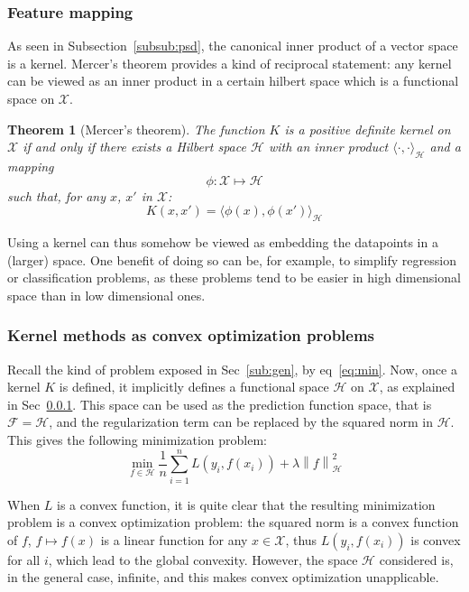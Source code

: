 \documentclass[a4paper, 11pt]{article}
\newtheorem{theorem}{Theorem}
\newcommand{\X}{\mathcal{X}}
\newcommand{\F}{\mathcal{F}}
\newcommand{\Hilb}{\mathcal{H}}
\newcommand{\x}{x_i}
\newcommand{\y}{y_i}
\newcommand{\normh}[1]{\left\| #1 \right\|_\Hilb}
\begin{document}
\subsubsection{Feature mapping}
\label{subsub:map}
As seen in Subsection~\ref{subsub:psd}, the canonical inner
product of a vector space is a kernel. Mercer's theorem provides
a kind of reciprocal statement: any kernel can be viewed as an
inner product in a certain hilbert space which is a functional
space on $\mathcal{X}$.
\begin{theorem} [Mercer's theorem]
The function $K$ is a positive definite kernel on $\mathcal{X}$ if and only
if there exists a Hilbert space $\mathcal{H}$ with an inner product $\langle
\cdot,\cdot\rangle_{\mathcal{H}}$ and a mapping
\begin{equation}
  \phi: \mathcal{X}\mapsto\mathcal{H}
\end{equation}
such that, for any $x$, $x'$ in $\mathcal{X}$:
\begin{equation}
  K(x,x') = \langle\phi(x),\phi(x')\rangle_{\mathcal{H}}
\end{equation}
\end{theorem}
Using a kernel can thus somehow be viewed as embedding the datapoints in
a (larger) space. One benefit of doing so can be, for example, to simplify
regression or classification problems, as these problems tend to
be easier in high dimensional space than in low dimensional ones.

\subsubsection{Kernel methods as convex optimization problems}
Recall the kind of problem exposed in Sec~\ref{sub:gen}, by eq~\ref{eq:min}.
Now, once a kernel $K$ is defined, it implicitly defines a functional space $\Hilb$ on $\X$, as
explained in Sec~\ref{subsub:map}. This space can be used as the prediction function space,
that is $\F = \Hilb$, and the regularization term can be replaced by the squared norm in $\Hilb$.
This gives the following minimization problem:
\begin{equation}
  \min\limits_{f\in\Hilb} \frac{1}{n}\sum\limits_{i=1}^nL(\y,f(\x)) + \lambda\normh{f}^2
  \label{eq:minkernel}
\end{equation}

When $L$ is a convex function, it is quite clear that the resulting minimization problem is
a convex optimization problem: the squared norm is a convex function of $f$, $f \mapsto f(x)$
is a linear function for any $x \in \X$, thus $L(\y,f(\x))$ is convex for all $i$, which lead
to the global convexity. However, the space $\Hilb$ considered is, in the general case, infinite,
and this makes convex optimization unapplicable.
\end{document}
